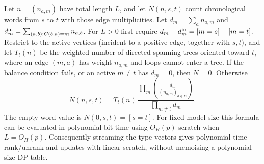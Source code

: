 \begin{proposition}\label{III:M:rev13:prop:euler-count}
Let $n=(n_{a,m})$ have total length $L$, and let $N(n,s,t)$ count
chronological words from $s$ to $t$ with those edge multiplicities.
Let $d_m=\sum_a n_{a,m}$ and $d_m^{\rm in}=\sum_{(a,b):G(b,a)=m}n_{a,b}$.
For $L>0$ first require
$d_m-d_m^{\rm in}=[m=s]-[m=t]$. Restrict to the active vertices
(incident to a positive edge, together with $s,t$), and let $T_t(n)$ be
the weighted number of directed spanning trees oriented toward $t$,
where an edge $(m,a)$ has weight $n_{a,m}$ and loops cannot enter a tree.
If the balance condition fails, or an active $m\ne t$ has $d_m=0$,
then $N=0$. Otherwise
\[
 N(n,s,t)=T_t(n)\,
 \frac{\displaystyle\prod_m\binom{d_m}{(n_{a,m})_{a\in\Sigma}}}
      {\displaystyle\prod_{m\ne t}d_m}.
\]
The empty-word value is $N(0,s,t)=[s=t]$.
For fixed model size this formula can be evaluated in polynomial bit time
using $O_H(p)$ scratch when $L=O_H(p)$. Consequently streaming the type
vectors gives polynomial-time rank/unrank and updates with linear scratch,
without memoising a polynomial-size DP table.
\end{proposition}



